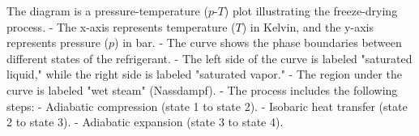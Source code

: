 The diagram is a pressure-temperature (\( p \)-\( T \)) plot illustrating the freeze-drying process.  
- The x-axis represents temperature (\( T \)) in Kelvin, and the y-axis represents pressure (\( p \)) in bar.  
- The curve shows the phase boundaries between different states of the refrigerant.  
- The left side of the curve is labeled "saturated liquid," while the right side is labeled "saturated vapor."  
- The region under the curve is labeled "wet steam" (Nassdampf).  
- The process includes the following steps:  
  - Adiabatic compression (state 1 to state 2).  
  - Isobaric heat transfer (state 2 to state 3).  
  - Adiabatic expansion (state 3 to state 4).